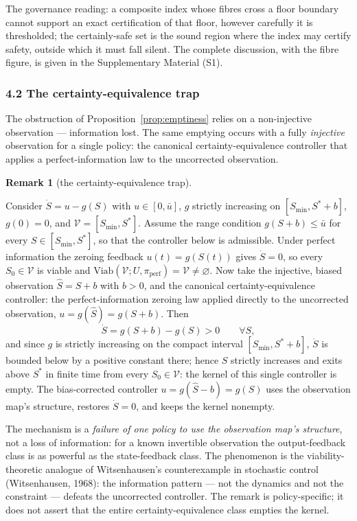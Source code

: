 \documentclass[10pt,twocolumn]{article}
\theoremstyle{definition}
\newtheorem{remark}{Remark}
\begin{document}
The governance reading: a composite index whose fibres cross a floor boundary cannot support an exact certification of that floor, however carefully it is thresholded; the certainly-safe set is the sound region where the index may certify safety, outside which it must fall silent. The complete discussion, with the fibre figure, is given in the Supplementary Material (S1).

\subsubsection{4.2 The certainty-equivalence
trap}\label{the-certainty-equivalence-trap}

The obstruction of Proposition~\ref{prop:emptiness} relies on a non-injective observation ---
information lost. The same emptying occurs with a fully
\emph{injective} observation for a single policy: the canonical
certainty-equivalence controller that applies a perfect-information law
to the uncorrected observation.

\begin{remark}[the certainty-equivalence trap]\label{rem:ce-trap}

Consider \(\dot S = u - g(S)\) with \(u \in [0, \bar u]\), \(g\) strictly
increasing on \([S_{\min}, S^* + b]\), \(g(0) = 0\), and
\(\mathcal{V} = [S_{\min}, S^*]\). Assume the range condition
\(g(S + b) \le \bar u\) for every \(S \in [S_{\min}, S^*]\), so that the
controller below is admissible. Under perfect information the zeroing
feedback \(u(t) = g(S(t))\) gives \(\dot S = 0\), so every
\(S_0 \in \mathcal{V}\) is viable and
\(\mathrm{Viab}(\mathcal{V}; U, \pi_{\mathrm{perf}}) = \mathcal{V} \neq \varnothing\).
Now take the injective, biased observation \(\hat S = S + b\) with
\(b > 0\), and the canonical certainty-equivalence controller: the
perfect-information zeroing law applied directly to the uncorrected
observation, \(u = g(\hat S) = g(S + b)\). Then
\[\dot S = g(S + b) - g(S) > 0 \qquad \forall S,\]
and since \(g\) is strictly increasing on the compact interval
\([S_{\min}, S^* + b]\), \(\dot S\) is bounded below by a positive
constant there; hence \(S\) strictly increases and exits above \(S^*\) in
finite time from every \(S_0 \in \mathcal{V}\): the kernel of this single
controller is empty. The bias-corrected controller
\(u = g(\hat S - b) = g(S)\) uses the observation map's structure, restores
\(\dot S = 0\), and keeps the kernel nonempty.

The mechanism is a \emph{failure of one policy to use the observation
map's structure}, not a loss of information: for a known invertible
observation the output-feedback class is as powerful as the
state-feedback class. The phenomenon is the viability-theoretic analogue
of Witsenhausen's counterexample in stochastic control (Witsenhausen,
1968): the information pattern --- not the dynamics and not the
constraint --- defeats the uncorrected controller. The remark is
policy-specific; it does not assert that the entire certainty-equivalence
class empties the kernel.

\end{remark}
\end{document}
